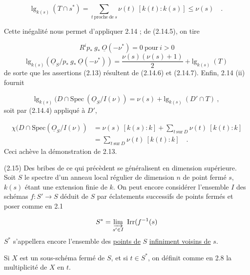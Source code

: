 \begin{equation*}
\mathrm{lg}_{k(s)}\ (T \cap s^*) = \sum_{t\ \mathrm{proche\ de}\ s} \nu(t)\ [k(t) : k(s)] \leq \nu(s) \quad .
\end{equation*}


Cette inégalité nous permet d'appliquer 2.14 ; de (2.14.5), on tire

\begin{equation*}
R^i p_* \ g_* \ \underline{O}(-\nu^*) = 0 \ \mathrm{pour}\ i > 0
\end{equation*}
\begin{equation*}
\mathrm{lg}_{k(s)}(\underline{O}_S/p_* \ g_* \ \underline{O}(-\nu^*)) = \frac{\nu(s)(\nu(s)+1)}{2} + \mathrm{lg}_{k(s)}\ (T)
\end{equation*}
de sorte que les assertions (2.13) résultent de (2.14.6) et (2.14.7). Enfin, 2.14 (ii) fournit

\begin{equation*}
\mathrm{lg}_{k(s)}\ (D \cap \mathrm{Spec}\ (\underline{O}_S/I(\nu)) = \nu(s) + \mathrm{lg}_{k(s)}\ (D' \cap T) \ ,
\end{equation*}
soit par (2.14.4) appliqué à $D'$,

\begin{equation*}
\begin{aligned}
\chi(D \cap \mathrm{Spec}(\underline{O}_S/I(\nu)) &= \nu(s)\ [k(s) : k] + \sum_{t\ \mathrm{sur}\ D} \nu(t)\ [k(t) : k] \\
&= \sum_{t\ \mathrm{sur}\ D} \nu(t)\ [k(t) : k] \quad .
\end{aligned}
\end{equation*}
Ceci achève la démonstration de 2.13.

(2.15) Des bribes de ce qui précèdent se généralisent en dimension supérieure. Soit $S$ le spectre d'un anneau local régulier de dimension $n$ de point fermé $s$, $k(s)$ étant une extension finie de $k$. On peut encore considérer l'ensemble $I$ des schémas $f : S' \longrightarrow S$ déduit de $S$ par éclatements successifs de points fermés et poser comme en 2.1

\begin{equation*}
S^* = \varinjlim_{s' \in I} \ \mathrm{Irr}(f^{-1}(s)
\end{equation*}
$S^*$ s'appellera encore l'ensemble des \underline{points de} $S$ \underline{infiniment voisins de} $s$.

Si $X$ est un sous-schéma fermé de $S$, et si $t \in S^*$, on définit comme en 2.8 la multiplicité de $X$ en $t$.

